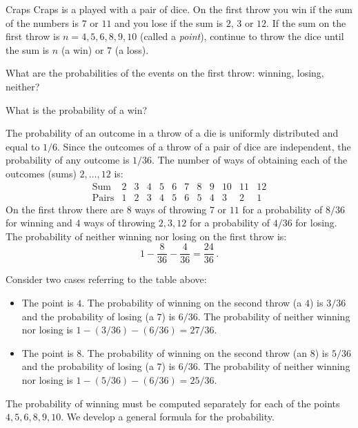 
\begin{prob}{Craps}
Craps is a played with a pair of dice. On the first throw you win if the sum of the numbers is $7$ or $11$ and you lose if the sum is $2$, $3$ or $12$. If the sum on the first throw is $n=4,5,6,8,9,10$ (called a \emph{point}), continue to throw the dice until the sum is $n$ (a win) or $7$ (a loss).

 What are the probabilities of the events on the first throw: winning, losing, neither?

 What is the probability of a win?
\end{prob}


 The probability of an outcome in a throw of a die is uniformly distributed and equal to $1/6$. Since the outcomes of a throw of a pair of dice are independent, the probability of any outcome is $1/36$. The number of ways of obtaining each of the outcomes (sums) $2,\ldots,12$ is:
\[
\begin{array}{l|rrrrrrrrrrr}
\textrm{Sum} & 2 & 3 & 4 & 5 & 6 & 7 & 8 & 9 & 10 & 11 & 12\\\hline
\textrm{Pairs} & 1 & 2 & 3 & 4 & 5 & 6 & 5 & 4 & 3 & 2 & 1
\end{array}
\]
On the first throw there are $8$ ways of throwing $7$ or $11$ for a probability of $8/36$ for winning and $4$ ways of throwing $2,3,12$ for a probability of $4/36$ for losing. The probability of neither winning nor losing on the first throw is:
\[
1 - \frac{8}{36} - \frac{4}{36} = \frac{24}{36}\,.
\]

Consider two cases referring to the table above:
\begin{itemize}
\item The point is $4$. The probability of winning on the second throw (a $4$) is $3/36$ and the probability of losing (a $7$) is $6/36$. The probability of neither winning nor losing is $1-(3/36)-(6/36)=27/36$.
\item The point is $8$. The probability of winning on the second throw (an $8$) is $5/36$ and the probability of losing (a $7$) is $6/36$. The probability of neither winning nor losing is $1-(5/36)-(6/36)=25/36$.
\end{itemize}
The probability of winning must be computed separately for each of the points $4,5,6,8,9,10$. We develop a general formula for the probability.

